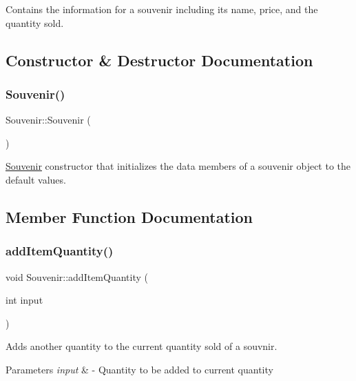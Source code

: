 Contains the information for a souvenir including its name, price, and the quantity sold. 

\subsection{Constructor \& Destructor Documentation}
\mbox{\label{class_souvenir_a1c80e600047ec0e9cc064cf78c79b630}} 
\subsubsection{\texorpdfstring{Souvenir()}{Souvenir()}}
{\footnotesize\ttfamily Souvenir\+::\+Souvenir (\begin{DoxyParamCaption}{ }\end{DoxyParamCaption})\hspace{0.3cm}{\ttfamily [inline]}}



\hyperlink{class_souvenir}{Souvenir} constructor that initializes the data members of a souvenir object to the default values. 



\subsection{Member Function Documentation}
\mbox{\label{class_souvenir_a512226cdc77f82549e31ae24f79816c7}} 
\subsubsection{\texorpdfstring{add\+Item\+Quantity()}{addItemQuantity()}}
{\footnotesize\ttfamily void Souvenir\+::add\+Item\+Quantity (\begin{DoxyParamCaption}\item[{int}]{input }\end{DoxyParamCaption})\hspace{0.3cm}{\ttfamily [inline]}}



Adds another quantity to the current quantity sold of a souvnir. 


\begin{DoxyParams}{Parameters}
{\em input} & -\/ Quantity to be added to current quantity \\
\hline
\end{DoxyParams}
\mbox{\label{class_souvenir_a828048672b2fe97e676333aedf67f2a4}} 
